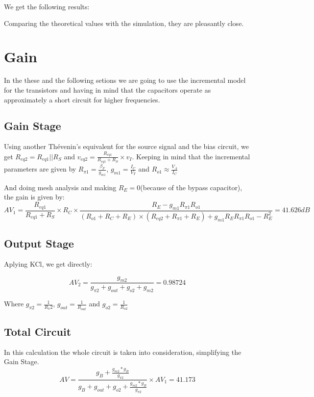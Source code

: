We get the following results:



Comparing the theoretical values with the simulation, they are pleasantly close.

\section{Gain}
In the these and the following setions we are going to use the incremental model for the transistors and having in mind that the capacitors operate as approximately a short circuit for higher frequencies.
\subsection{Gain Stage}
Using another Thévenin’s equivalent for the source signal and the bias circuit, we get $R_{eq2}=R_{eq1}||R_{S}$ and  $v_{eq2}=\frac{R_{eq1}}{R_{eq1}+R_{S}}\times v_{I}$.
Keeping in mind that the incremental parameters are given by $R_{\pi1}=\frac{\beta_{F}}{g_{m1}}$, $g_{m1}=\frac{I_{C}}{V_{T}}$  and $R_{o1}\approx \frac{V_{A}}{I_{C}}$

And doing mesh analysis and making $R_{E}=0$(because of the bypass capacitor), the gain is given by:
\begin{equation}
  AV_{1}= \frac{R_{eq1}}{R_{eq1}+R_{S}}\times R_{C} \times \frac {R_{E} - g_{m1} R_{\pi1} R_{o1} }{(R_{o1}+R_{C}+R_{E})\times(R_{eq2}+R_{\pi1}+R_{E})+g_{m1} R_{E} R_{\pi1} R_{o1} - R_{E}^2}=41.626dB
  \label{eq:Gain1}
\end{equation}


\subsection{Output Stage}
Aplying KCl, we get directly:

\begin{equation}
  AV_{2}= \frac{g_{m2}}{g_{\pi2}+g_{out}+g_{o2}+g_{m2}}=0.98724
  \label{eq:Gain1}
\end{equation}

Where $g_{\pi2}=\frac{1}{R_\pi2}$, $g_{out}=\frac{1}{R_{out}}$ and $g_{o2}=\frac{1}{R_{o2}}$

\subsection{Total Circuit}
In this calculation the whole circuit is taken into consideration, simplifying the Gain Stage.
\begin{equation}
  AV= \frac{g_{B}+\frac{g_{m2}*g_{B}}{g_{\pi2}}}{g_{B}+g_{out}+g_{o2}+\frac{g_{m2}*g_{B}}{g_{\pi2}}} \times AV_{1}=41.173
  \label{eq:Gain1}
\end{equation}



